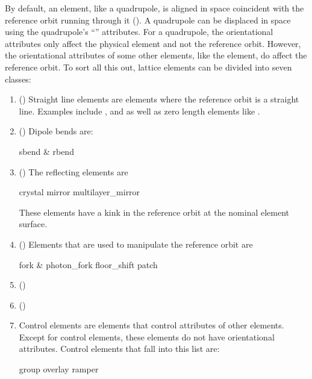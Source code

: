 By default, an element, like a quadrupole, is aligned in space coincident with the reference orbit
running through it (). A quadrupole can be displaced in space using the
quadrupole's ``'' attributes. For a quadrupole, the orientational attributes only
affect the physical element and not the reference orbit. However, the orientational attributes of
some other elements, like the  element, do affect the reference orbit. To sort all this
out, lattice elements can be divided into seven classes:
  \begin{enumerate}
%
\item{} () \Newline
Straight line elements are elements where the reference orbit is a straight line. Examples include
, and  as well as zero length elements like .
%
\item{} () \Newline
Dipole bends are:
\begin{example}
  sbend \& rbend
\end{example}
%
\item{} () \Newline
The reflecting elements are
\begin{example}
  crystal
  mirror
  multilayer_mirror
\end{example}
These elements have a kink in the reference orbit at the nominal
element surface.
%
\item{} () \Newline
Elements that are used to manipulate the reference orbit are
\begin{example}
  fork \& photon_fork
  floor_shift
  patch
\end{example}
%
\item{} () \Newline
%
\item{} () \Newline
%
\item{} \Newline
Control elements are elements that control attributes of other elements. Except for 
control elements, these elements do not have orientational attributes. Control elements that fall
into this list are:
\begin{example}
  group
  overlay
  ramper
\end{example}
  \end{enumerate}

